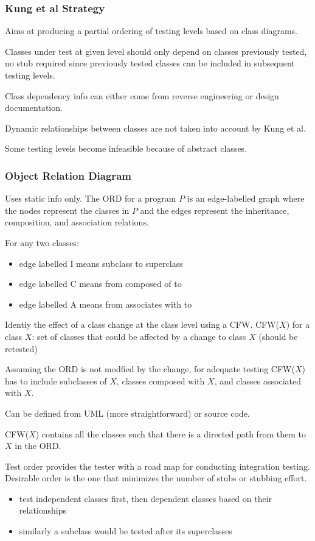 \documentclass[11pt]{article}
\begin{document}
\subsubsection{Kung et al Strategy}
\label{sec:orga7a589c}
Aims at producing a partial ordering of testing levels based on class
diagrams.

Classes under test at given level should only depend on classes
previously tested, no stub required since previously tested
classes can be included in subsequent testing levels.

Class dependency info can either come from reverse engineering or
design documentation.

Dynamic relationships between classes are not taken into account by Kung et al.

Some testing levels become infeasible because of abstract classes.
\subsubsection{Object Relation Diagram}
\label{sec:orgf02e77b}
Uses static info only.
The ORD for a program \(P\) is an edge-labelled graph where the nodes
represent the classes in \(P\) and the edges represent the
inheritance, composition, and association relations.

For any two classes:
\begin{itemize}
\item edge labelled I means subclass to superclass
\item edge labelled C means from  composed of to
\item edge labelled A means from associates with to
\end{itemize}

Identiy the effect of a class change at the class level using a CFW.
CFW(\(X\)) for a class \(X\): set of classes that could be
affected by a change to class \(X\) (should be retested)

Assuming the ORD is not modfied by the change, for adequate testing
CFW(\(X\)) has to include subclasses of \(X\), classes composed with \(X\), and
classes associated with \(X\).

Can be defined from UML (more straightforward) or source code.

CFW(\(X\)) contains all the classes such that there is a directed path from
them to \(X\) in the ORD.

Test order provides the tester with a road map for conducting integration
testing. Desirable order is the one that minimizes the number of stubs
or stubbing effort.
\begin{itemize}
\item test independent classes first, then dependent classes based on their
relationships
\item similarly a subclass would be tested after its superclasses
\end{itemize}
\end{document}
